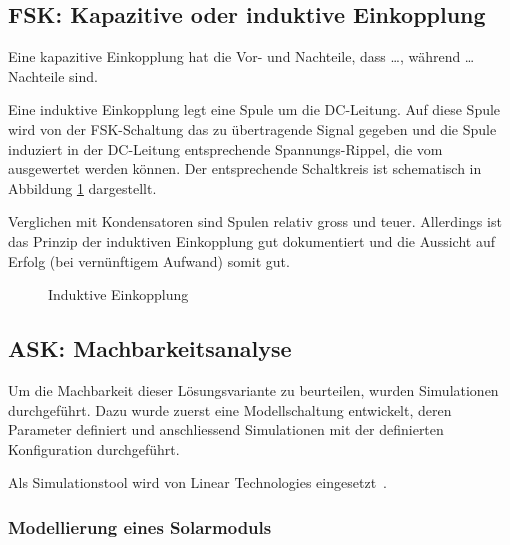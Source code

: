 \subsection{FSK: Kapazitive oder induktive Einkopplung}
\label{subsec:hw:fsk:kapaVsInduk}

Eine kapazitive Einkopplung hat die Vor- und Nachteile, dass \ldots, w\"ahrend
\ldots Nachteile sind.


Eine induktive Einkopplung legt eine  Spule um die DC-Leitung. Auf diese Spule
wird von der FSK-Schaltung das zu  \"ubertragende Signal gegeben und die Spule
induziert in  der DC-Leitung  entsprechende Spannungs-Rippel, die  vom \Master
ausgewertet werden k\"onnen. Der entsprechende  Schaltkreis ist schematisch in
Abbildung \ref{fig:circ:coupling:inductive} dargestellt.

Verglichen mit  Kondensatoren sind Spulen relativ  gross und teuer. Allerdings
ist das Prinzip  der induktiven Einkopplung gut dokumentiert  und die Aussicht
auf Erfolg (bei vern\"unftigem Aufwand) somit gut.

\begin{figure}[h!tb]
    \centering
    
    \caption{Induktive Einkopplung}
    \label{fig:circ:coupling:inductive}
\end{figure}


\subsection{ASK: Machbarkeitsanalyse}
\label{subsec:hw:ask:machbarkeit}

Um die Machbarkeit dieser L\"osungsvariante zu beurteilen, wurden Simulationen
durchgef\"uhrt. Dazu  wurde  zuerst  eine  Modellschaltung  entwickelt,  deren
Parameter  definiert  und  anschliessend   Simulationen  mit  der  definierten
Konfiguration durchgef\"uhrt.

Als   Simulationstool  wird      von  Linear   Technologies
eingesetzt~\cite{ref:ltspice}.


\subsubsection{Modellierung eines Solarmoduls}
\label{subsubsec:hw:ask:modell}


